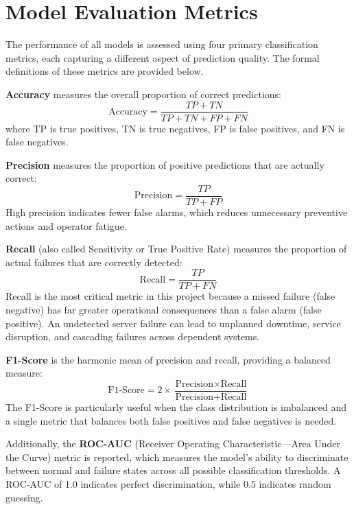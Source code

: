\documentclass[12pt,letterpaper]{report}
\begin{document}
\section{Model Evaluation Metrics}

The performance of all models is assessed using four primary classification metrics, each capturing a different aspect of prediction quality. The formal definitions of these metrics are provided below.

\textbf{Accuracy} measures the overall proportion of correct predictions:
\begin{equation}
  \text{Accuracy} = \frac{TP + TN}{TP + TN + FP + FN}
\end{equation}
where TP is true positives, TN is true negatives, FP is false positives, and FN is false negatives.

\textbf{Precision} measures the proportion of positive predictions that are actually correct:
\begin{equation}
  \text{Precision} = \frac{TP}{TP + FP}
\end{equation}
High precision indicates fewer false alarms, which reduces unnecessary preventive actions and operator fatigue.

\textbf{Recall} (also called Sensitivity or True Positive Rate) measures the proportion of actual failures that are correctly detected:
\begin{equation}
  \text{Recall} = \frac{TP}{TP + FN}
\end{equation}
Recall is the most critical metric in this project because a missed failure (false negative) has far greater operational consequences than a false alarm (false positive). An undetected server failure can lead to unplanned downtime, service disruption, and cascading failures across dependent systems.

\textbf{F1-Score} is the harmonic mean of precision and recall, providing a balanced measure:
\begin{equation}
  \text{F1-Score} = 2 \times \frac{\text{Precision} \times \text{Recall}}{\text{Precision} + \text{Recall}}
\end{equation}
The F1-Score is particularly useful when the class distribution is imbalanced and a single metric that balances both false positives and false negatives is needed.

Additionally, the \textbf{ROC-AUC} (Receiver Operating Characteristic---Area Under the Curve) metric is reported, which measures the model's ability to discriminate between normal and failure states across all possible classification thresholds. A ROC-AUC of 1.0 indicates perfect discrimination, while 0.5 indicates random guessing.
\end{document}
